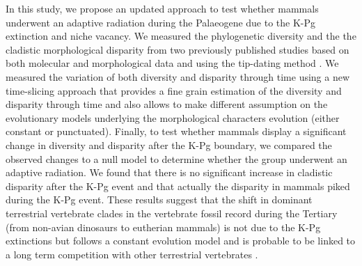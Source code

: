 \documentclass[12pt,letterpaper]{article}
\begin{document}
In this study, we propose an updated approach to test whether mammals underwent an adaptive radiation during the Palaeogene due to the K-Pg extinction and niche vacancy. We measured the phylogenetic diversity and the the cladistic morphological disparity from two previously published studies \cite{Slater2012MEE,beckancient2014} based on both molecular and morphological data and using the tip-dating method \cite{ronquista2012}. We measured the variation of both diversity and disparity through time using a new time-slicing approach that provides a fine grain estimation of the diversity and disparity through time and also allows to make different assumption on the evolutionary models underlying the morphological characters evolution (either constant or punctuated). Finally, to test whether mammals display a significant change in diversity and disparity after the K-Pg boundary, we compared the observed changes to a null model to determine whether the group underwent an adaptive radiation. We found that there is no significant increase in cladistic disparity after the K-Pg event and that actually the disparity in mammals piked during the K-Pg event. These results suggest that the shift in dominant terrestrial vertebrate clades in the vertebrate fossil record during the Tertiary (from non-avian dinosaurs to eutherian mammals) is not due to the K-Pg extinctions but follows a constant evolution model and is probable to be linked to a long term competition with other terrestrial vertebrates \cite{Brusatte12092008}.




\end{document}
